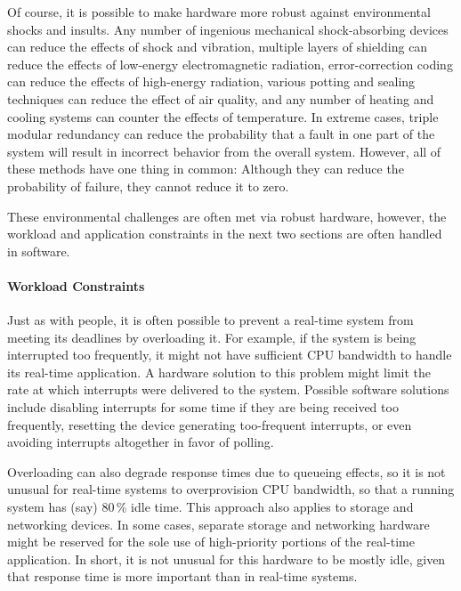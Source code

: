 Of course, it is possible to make hardware more robust against
environmental shocks and insults.
Any number of ingenious mechanical shock-absorbing devices can reduce the
effects of shock and vibration, multiple layers of shielding can reduce
the effects of low-energy electromagnetic radiation, error-correction
coding can reduce the effects of high-energy radiation, various potting
and sealing techniques can reduce the effect of air quality, and any
number of heating and cooling systems can counter the effects of temperature.
In extreme cases, triple modular redundancy can reduce the probability that
a fault in one part of the system will result in incorrect behavior from
the overall system.
However, all of these methods have one thing in common:  Although they
can reduce the probability of failure, they cannot reduce it to zero.

These environmental challenges are often met via robust hardware, however,
the workload and application constraints in the next two sections are
often handled in software.

\paragraph{Workload Constraints}
\label{sec:advsync:Workload Constraints}

Just as with people, it is often possible to prevent a real-time system
from meeting its deadlines by overloading it.
For example, if the system is being interrupted too frequently, it might
not have sufficient CPU bandwidth to handle its real-time application.
A hardware solution to this problem might limit the rate at which
interrupts were delivered to the system.
Possible software solutions include disabling interrupts for some time if
they are being received too frequently,
resetting the device generating too-frequent interrupts,
or even avoiding interrupts altogether in favor of polling.

Overloading can also degrade response times due to queueing effects,
so it is not unusual for real-time systems to overprovision CPU bandwidth,
so that a running system has (say) 80\,\% idle time.
This approach also applies to storage and networking devices.
In some cases, separate storage and networking hardware might be reserved
for the sole use of high-priority portions of the real-time application.
In short, it is not unusual for this hardware to be mostly idle, given
that response time is more important than  in
real-time systems.

